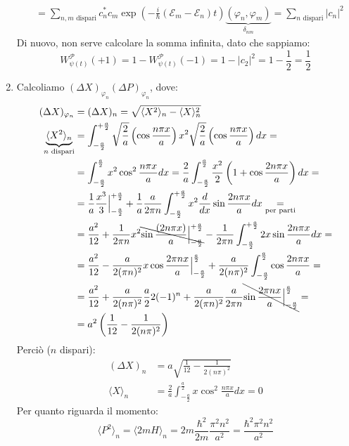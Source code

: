 \documentclass[../../FisicaTeorica.tex]{subfiles}
\begin{document}
\begin{enumerate}
\begin{align*}
&=\sum_{n, m \text{ dispari}} c_n^* c_m \exp\left(-\frac{i}{\hbar}(\mathcal{E}_m-\mathcal{E}_n)t\right)\underbrace{(\varphi_n, \varphi_m)}_{\delta_{nm}}=\sum_{n \text{ dispari}}|c_n|^2
\end{align*}
Di nuovo, non serve calcolare la somma infinita, dato che sappiamo:
\[
W_{\psi(t)}^\mathcal{P}(+1)=1-W_{\psi(t)}^\mathcal{P}(-1)=1-|c_2|^2=1-\frac{1}{2}=\frac{1}{2}
\]
\item Calcoliamo $(\Delta X)_{\varphi_n}(\Delta P)_{\varphi_n}$, dove:
\begin{align*}
(\Delta X)_{\varphi_n}&=(\Delta X)_{n} = \sqrt{\langle X^2\rangle_n - \langle X\rangle^2_n}\\
\underbrace{\langle X^2\rangle_n}_{n \text{ dispari}} &= \int_{-\frac{a}{2}}^{+\frac{a}{2}}\sqrt{\frac{2}{a}}\left(\cos\frac{n\pi x}{a}\right)x^2 \sqrt{\frac{2}{a}}\left(\cos\frac{n\pi x}{a}\right)dx =\\
&=\int_{-\frac{a}{2}}^{\frac{a}{2}} x^2 \cos^2 \frac{n\pi x}{a} dx = \frac{2}{a} \int_{-\frac{a}{2}}^{\frac{a}{2}} \frac{x^2}{2}\left(1+ \cos\frac{2n\pi x}{a}\right)dx =\\
&=\frac{1}{a}\frac{x^3}{3}\Big|_{-\frac{a}{2}}^{+\frac{a}{2}}+\frac{1}{a}\frac{a}{2\pi n}\int_{-\frac{a}{2}}^{+\frac{a}{2}} x^2 \frac{d}{dx}\sin\frac{2n\pi x}{a}dx \underset{\text{per parti}}{=}\\
&=\frac{a^2}{12}+\frac{1}{2\pi n} x^2 \bcancel{\sin\frac{(2n\pi x)}{a}\Big|_{-\frac{a}{2}}^{+\frac{a}{2}}} - \frac{1}{2\pi n}\int_{-\frac{a}{2}}^{+\frac{a}{2}} 2x \sin \frac{2n\pi x}{a} dx=\\
&=\frac{a^2}{12} - \frac{a}{2(\pi n)^2} x \cos\frac{2\pi n x}{a}\Big|_{-\frac{a}{2}}^{\frac{a}{2}} + \frac{a}{2(n\pi)^2}\int_{-\frac{a}{2}}^{\frac{a}{2}} \cos \frac{2n\pi x}{a}=\\
&=\frac{a^2}{12}+\frac{a}{2(n\pi)^2}\frac{a}{2}2(-1)^n + \frac{a}{2(\pi n)^2}\frac{a}{2\pi n}\bcancel{\sin\frac{2\pi n x}{a}\Big|_{-\frac{a}{2}}^{\frac{a}{2}}} =\\
&=a^2 \left(\frac{1}{12}-\frac{1}{2(n\pi)^2}\right)
\end{align*}
Perciò ($n$ dispari):
\begin{align*}
(\Delta X)_n &= a\sqrt{\frac{1}{12}-\frac{1}{2(n\pi)^2}}\\
\langle X\rangle_n &= \frac{2}{a} \int_{-\frac{a}{2}}^{\frac{a}{2}} x \cos^2 \frac{n\pi x}{a} dx =0
\end{align*}
Per quanto riguarda il momento:
\[
\langle P^2\rangle_n = \langle 2mH\rangle_n = 2m \frac{\hbar^2}{2m}\frac{\pi^2 n^2}{a^2}=\frac{\hbar^2 \pi^2 n^2}{a^2}
\]
\end{enumerate}
\end{document}
